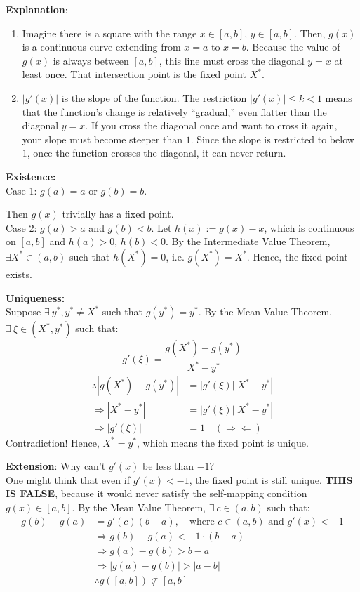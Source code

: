 \documentclass[12pt, a4paper]{article}
\makeatletter
\theoremstyle{break}
\renewenvironment{proof}[1][\proofname]{\par
  \pushQED{\qed}%
  \normalfont \topsep6\p@\@plus6\p@\relax
  \trivlist
  \item[\hskip\labelsep\bfseries #1\@addpunct{.}]\mbox{}\newline\ignorespaces
}{%
  \popQED\endtrivlist\@endpefalse
}
\makeatother
\begin{document}
\noindent \textbf{Explanation}:
\begin{enumerate}
    \item Imagine there is a square with the range $x \in [a ,b]$, $y \in [a, b]$.
    Then, $g(x)$ is a continuous curve extending from $x = a$ to $x = b$.
    Because the value of $g(x)$ is always between $[a,b]$, this line must cross the diagonal $y = x$ at least once.
    That intersection point is the fixed point $X^*$.
    \item $|g'(x)|$ is the slope of the function. The restriction $|g'(x)| \le k < 1$ means that the function's change is relatively ``gradual,'' even flatter than the diagonal $y = x$.
    If you cross the diagonal once and want to cross it again, your slope must become steeper than $1$.
    Since the slope is restricted to below $1$, once the function crosses the diagonal, it can never return.
\end{enumerate}

\begin{proof}
\textbf{Existence:} \\
\indent Case 1: $g(a) = a$ or $g(b) = b$. 

Then $g(x)$ trivially has a fixed point.
\\
\indent Case 2: $g(a) > a$ and $g(b) < b$.
Let $h(x) := g(x) - x$, which is continuous on $[a,b]$ and $h(a) > 0$, $h(b) < 0$.
By the Intermediate Value Theorem, $\exists X^* \in (a ,b)$ such that $h(X^*) = 0$, i.e. $g(X^*) = X^*$.
Hence, the fixed point exists.

\vspace{0.5cm}
\noindent \textbf{Uniqueness:} \\
\indent Suppose $\exists \ y^*, y^* \neq X^*$ such that $g(y^*) = y^*$.
By the Mean Value Theorem, $\exists \ \xi \in (X^*, y^*)$ such that:
\[ g'(\xi) = \frac{g(X^*) - g(y^*)}{X^* - y^*} \]
\begin{align*}
\therefore |g(X^*) - g(y^*)| &= |g'(\xi)||X^* - y^*| \\
\Rightarrow |X^* - y^*| &= |g'(\xi)||X^* - y^*| \\
\Rightarrow |g'(\xi)| &= 1 \quad (\Rightarrow\Leftarrow)
\end{align*}
Contradiction!
Hence, $X^* = y^*$, which means the fixed point is unique.
\end{proof}

\noindent \textbf{Extension}: Why can't $g'(x)$ be less than $-1$?
\\
One might think that even if $g'(x) < -1$, the fixed point is still unique.
\textbf{THIS IS FALSE}, because it would never satisfy the self-mapping condition $g(x) \in [a ,b]$.
By the Mean Value Theorem, $\exists \ c \in (a ,b)$ such that:
\begin{align*}
g(b) - g(a) &= g'(c)(b-a), \quad \text{where } c \in (a, b) \text{ and } g'(x) < -1 \\
&\Rightarrow g(b) - g(a) < -1 \cdot (b-a) \\
&\Rightarrow g(a) - g(b) > b - a \\
&\Rightarrow |g(a) - g(b)| > |a - b| \\
&\therefore g([a,b]) \not\subset [a, b]
\end{align*}
\end{document}

